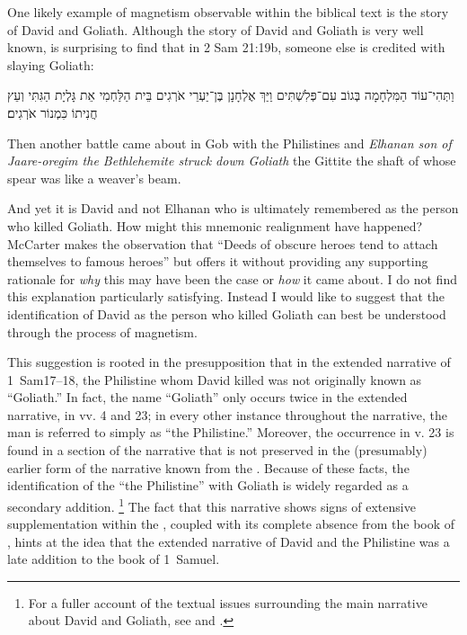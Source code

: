 One likely example of magnetism observable within the biblical text is the story of David and Goliath. Although the story of David and Goliath is very well known, is surprising to find that in 2 Sam 21:19b, someone else is credited with slaying Goliath:
\begin{hebrewtext}
    וַתְּהִי־עוֹד הַמִּלְחָמָה בְּגוֹב עִם־פְּלִשְׁתִּים וַיַּךְ אֶלְחָנָן בֶּן־יַעְרֵי אֹרְגִים בֵּית הַלַּחְמִי אֵת גָּלְיָת הַגִּתִּי וְעֵץ חֲנִיתוֹ כִּמְנוֹר אֹרְגִים׃
\end{hebrewtext}
\begin{translation}
    Then another battle came about in Gob with the Philistines and \emph{Elhanan son of Jaare-oregim the Bethlehemite struck down Goliath} the Gittite the shaft of whose spear was like a weaver's beam.
\end{translation}
\noindent
And yet it is David and not Elhanan who is ultimately remembered as the person who killed Goliath. How might this mnemonic realignment have happened? McCarter makes the observation that ``Deeds of obscure heroes tend to attach themselves to famous heroes''%
    \autocite[450]{mccarter1984}
but offers it without providing any supporting rationale for \emph{why} this may have been the case or \emph{how} it came about. I do not find this explanation particularly satisfying. Instead I would like to suggest that the identification of David as the person who killed Goliath can best be understood through the process of magnetism.

This suggestion is rooted in the presupposition that in the extended narrative of 1~Sam17--18, the Philistine whom David killed was not originally known as ``Goliath.'' In fact, the name ``Goliath'' only occurs twice in the extended narrative, in vv. 4 and 23; in every other instance throughout the narrative, the man is referred to simply as ``the Philistine.'' Moreover, the occurrence in v. 23 is found in a section of the narrative that is not preserved in the (presumably) earlier form of the narrative known from the \lxx. Because of these facts, the identification of the ``the Philistine'' with Goliath is widely regarded as a secondary addition.%
    \footnote{For a fuller account of the textual issues surrounding the main narrative about David and Goliath, see \cite[280--309]{mccarter1980} and \cite[69--77]{mckenzie2000}.}
The fact that this narrative shows signs of extensive supplementation within the \mt, coupled with its complete absence from the book of \chronicles, hints at the idea that the extended narrative of David and the Philistine was a late addition to the book of 1~Samuel.%

